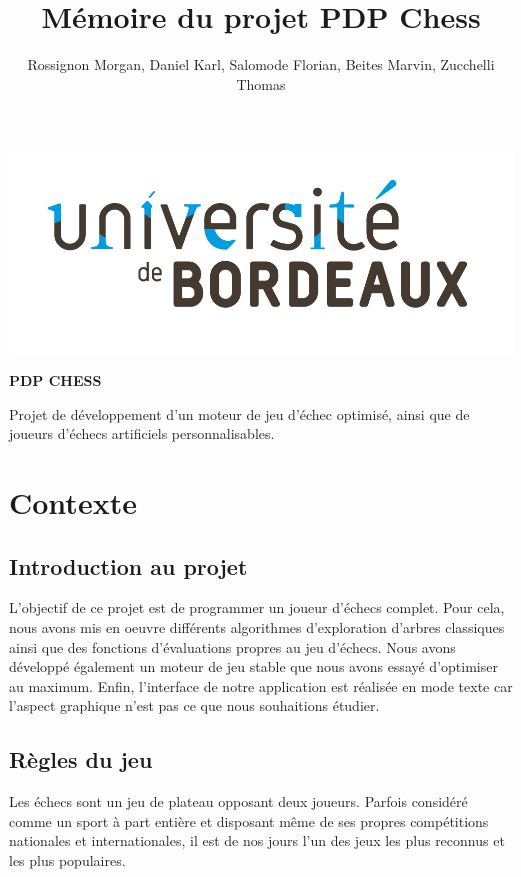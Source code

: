 \huge\documentclass{article}
\title{\textbf{Mémoire du projet PDP Chess}}
\author{Rossignon Morgan, Daniel Karl, Salomode Florian, Beites Marvin, Zucchelli Thomas}
\begin{document}
\maketitle
\centerline{\includegraphics[scale = 0.5]{img/Universite Bordeaux RVB-02.jpg}}

\huge \centerline{\textbf{PDP CHESS}}

\medskip
Projet de développement d'un moteur de jeu d'échec optimisé, ainsi que de joueurs d'échecs artificiels personnalisables.
\normalsize
\newpage

\tableofcontents
\newpage

\section{Contexte}

\subsection{Introduction au projet}

L'objectif de ce projet est de programmer un joueur d'échecs complet.
\newline
Pour cela, nous avons mis en oeuvre différents algorithmes d'exploration d'arbres classiques ainsi que des fonctions d'évaluations propres au jeu d'échecs. Nous avons développé également un moteur de jeu stable que nous avons essayé d'optimiser au maximum.
\newline
Enfin, l'interface de notre application est réalisée en mode texte car l'aspect graphique n'est pas ce que nous souhaitions étudier.

\subsection{Règles du jeu}

Les échecs sont un jeu de plateau opposant deux joueurs. Parfois considéré comme un sport à part entière et disposant même de ses propres compétitions nationales et internationales, il est de nos jours l'un des jeux les plus reconnus et les plus populaires.
\end{document}
